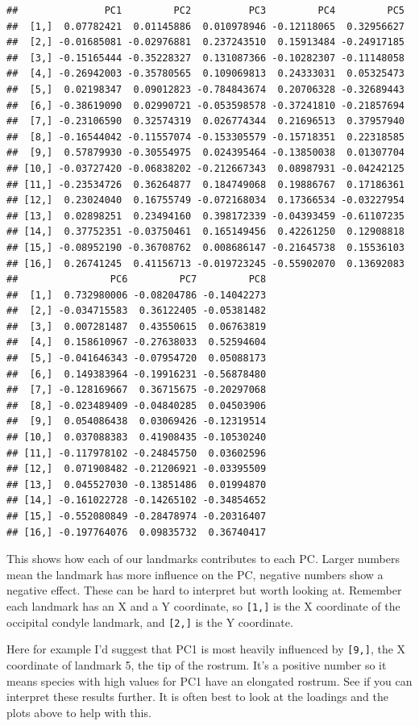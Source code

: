 \documentclass[]{book}
\begin{document}
\begin{verbatim}
##               PC1         PC2          PC3         PC4         PC5
##  [1,]  0.07782421  0.01145886  0.010978946 -0.12118065  0.32956627
##  [2,] -0.01685081 -0.02976881  0.237243510  0.15913484 -0.24917185
##  [3,] -0.15165444 -0.35228327  0.131087366 -0.10282307 -0.11148058
##  [4,] -0.26942003 -0.35780565  0.109069813  0.24333031  0.05325473
##  [5,]  0.02198347  0.09012823 -0.784843674  0.20706328 -0.32689443
##  [6,] -0.38619090  0.02990721 -0.053598578 -0.37241810 -0.21857694
##  [7,] -0.23106590  0.32574319  0.026774344  0.21696513  0.37957940
##  [8,] -0.16544042 -0.11557074 -0.153305579 -0.15718351  0.22318585
##  [9,]  0.57879930 -0.30554975  0.024395464 -0.13850038  0.01307704
## [10,] -0.03727420 -0.06838202 -0.212667343  0.08987931 -0.04242125
## [11,] -0.23534726  0.36264877  0.184749068  0.19886767  0.17186361
## [12,]  0.23024040  0.16755749 -0.072168034  0.17366534 -0.03227954
## [13,]  0.02898251  0.23494160  0.398172339 -0.04393459 -0.61107235
## [14,]  0.37752351 -0.03750461  0.165149456  0.42261250  0.12908818
## [15,] -0.08952190 -0.36708762  0.008686147 -0.21645738  0.15536103
## [16,]  0.26741245  0.41156713 -0.019723245 -0.55902070  0.13692083
##                PC6         PC7         PC8
##  [1,]  0.732980006 -0.08204786 -0.14042273
##  [2,] -0.034715583  0.36122405 -0.05381482
##  [3,]  0.007281487  0.43550615  0.06763819
##  [4,]  0.158610967 -0.27638033  0.52594604
##  [5,] -0.041646343 -0.07954720  0.05088173
##  [6,]  0.149383964 -0.19916231 -0.56878480
##  [7,] -0.128169667  0.36715675 -0.20297068
##  [8,] -0.023489409 -0.04840285  0.04503906
##  [9,]  0.054086438  0.03069426 -0.12319514
## [10,]  0.037088383  0.41908435 -0.10530240
## [11,] -0.117978102 -0.24845750  0.03602596
## [12,]  0.071908482 -0.21206921 -0.03395509
## [13,]  0.045527030 -0.13851486  0.01994870
## [14,] -0.161022728 -0.14265102 -0.34854652
## [15,] -0.552080849 -0.28478974 -0.20316407
## [16,] -0.197764076  0.09835732  0.36740417
\end{verbatim}

This shows how each of our landmarks contributes to each PC. Larger
numbers mean the landmark has more influence on the PC, negative numbers
show a negative effect. These can be hard to interpret but worth looking
at. Remember each landmark has an X and a Y coordinate, so
\texttt{{[}1,{]}} is the X coordinate of the occipital condyle landmark,
and \texttt{{[}2,{]}} is the Y coordinate.

Here for example I'd suggest that PC1 is most heavily influenced by
\texttt{{[}9,{]}}, the X coordinate of landmark 5, the tip of the
rostrum. It's a positive number so it means species with high values for
PC1 have an elongated rostrum. See if you can interpret these results
further. It is often best to look at the loadings and the plots above to
help with this.
\end{document}
